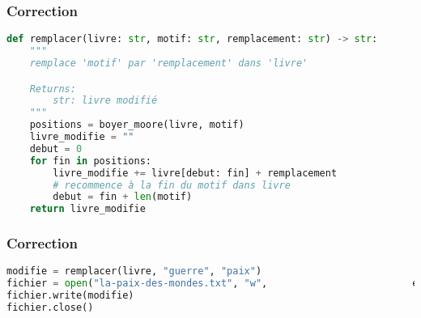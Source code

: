\documentclass[svgnames,11pt]{beamer}
\begin{document}
\begin{frame}[fragile]
    \frametitle{Correction}

\begin{center}
\begin{lstlisting}[language=Python , basicstyle=\ttfamily\small, xleftmargin=0.2em, xrightmargin=-4em]
def remplacer(livre: str, motif: str, remplacement: str) -> str:
    """
    remplace 'motif' par 'remplacement' dans 'livre'

    Returns:
        str: livre modifié
    """
    positions = boyer_moore(livre, motif)
    livre_modifie = ""
    debut = 0
    for fin in positions:
        livre_modifie += livre[debut: fin] + remplacement
        # recommence à la fin du motif dans livre
        debut = fin + len(motif)
    return livre_modifie
\end{lstlisting}
\end{center}  

\end{frame}
\begin{frame}[fragile]
    \frametitle{Correction}

\begin{center}
\begin{lstlisting}[language=Python , basicstyle=\ttfamily\small, xleftmargin=0.2em, xrightmargin=0em]
modifie = remplacer(livre, "guerre", "paix")
fichier = open("la-paix-des-mondes.txt", "w",                         encoding="utf8")
fichier.write(modifie)
fichier.close()
\end{lstlisting}
\label{CODE}
\end{center}

\end{frame}
\end{document}
